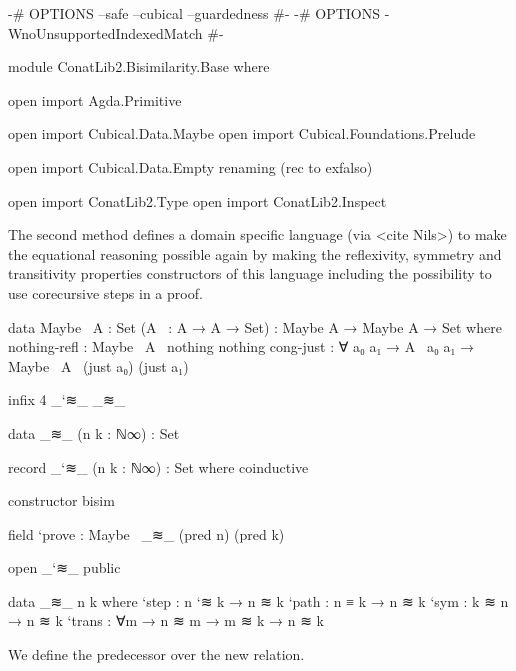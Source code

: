 \begin{code}[hide]
{-# OPTIONS --safe --cubical --guardedness #-}
{-# OPTIONS -WnoUnsupportedIndexedMatch #-}

module ConatLib2.Bisimilarity.Base where

open import Agda.Primitive

open import Cubical.Data.Maybe
open import Cubical.Foundations.Prelude

open import Cubical.Data.Empty
  renaming (rec to exfalso)

open import ConatLib2.Type
open import ConatLib2.Inspect
\end{code}

The second method defines a domain specific language (via <cite Nils>) to make
the equational reasoning possible again by making the reflexivity, symmetry and
transitivity properties constructors of this language including the possibility
to use corecursive steps in a proof.

\begin{code}
data Maybe~ {A : Set} (A~ : A → A → Set) : Maybe A → Maybe A → Set where
  nothing-refl : Maybe~ A~ nothing nothing
  cong-just : ∀ {a₀ a₁} → A~ a₀ a₁ → Maybe~ A~ (just a₀) (just a₁)
\end{code}
\begin{code}[hide]
infix 4 _`≋_ _≋_
\end{code}
\begin{code}
data _≋_ (n k : ℕ∞) : Set

record _`≋_ (n k : ℕ∞) : Set where
  coinductive
\end{code}
\begin{code}[hide]
  constructor bisim
\end{code}
\begin{code}
  field
    `prove : Maybe~ _≋_ (pred n) (pred k)
\end{code}
\begin{code}[hide]
open _`≋_ public
\end{code}
\begin{code}
data _≋_ n k where
  `step  : n `≋ k → n ≋ k
  `path  : n ≡ k → n ≋ k
  `sym   : k ≋ n → n ≋ k
  `trans : ∀{m} → n ≋ m → m ≋ k → n ≋ k
\end{code}

We define the predecessor over the new  relation.

